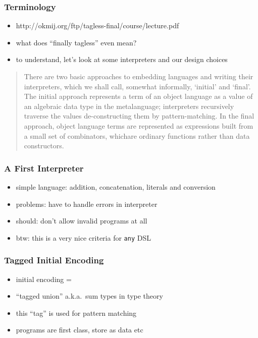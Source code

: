\documentclass[aspectratio=169]{beamer}
\begin{document}
\begin{frame}
  \frametitle{Terminology}
  \begin{itemize}
  \item http://okmij.org/ftp/tagless-final/course/lecture.pdf
  \item what does ``finally tagless'' even mean?
  \item to understand, let's look at some interpreters and our design choices
  \end{itemize}

  \begin{quote}
    There are two basic approaches to embedding languages and writing
    their interpreters, which we shall call, somewhat informally,
    ‘initial’ and ‘final’. The initial approach represents a term of an
    object language as a value of an algebraic data type in the
    metalanguage; interpreters recursively traverse the values
    de-constructing them by pattern-matching. In the final approach,
    object language terms are represented as expressions built from a
    small set of combinators, whichare ordinary functions rather than
    data constructors.
  \end{quote}
\end{frame}

\begin{frame}
  \frametitle{A First Interpreter}
  \begin{itemize}
  \item simple language: addition, concatenation, literals and conversion
  \item problems: have to handle errors in interpreter
  \item should: don't allow invalid programs at all
  \item btw: this is a very nice criteria for \texttt{any} DSL
  \end{itemize}
\end{frame}

\begin{frame}
  \frametitle{Tagged Initial Encoding}
  \begin{itemize}
  \item initial encoding =
  \item ``tagged union'' a.k.a.\ sum types in type theory
  \item this ``tag'' is used for pattern matching
  \item programs are first class, store as data etc
  \end{itemize}
\end{frame}
\end{document}
